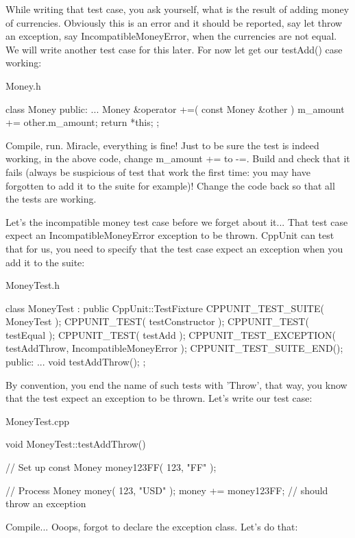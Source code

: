 While writing that test case, you ask yourself, what is the result of adding money of currencies. Obviously this is an error and it should be reported, say let throw an exception, say {\ttfamily IncompatibleMoneyError}, when the currencies are not equal. We will write another test case for this later. For now let get our testAdd() case working:

{\ttfamily Money.h} 
\begin{DoxyCode}
class Money
{
public:
...
  Money &operator +=( const Money &other )
  {
    m_amount += other.m_amount;
    return *this;
  }
}; 
\end{DoxyCode}


Compile, run. Miracle, everything is fine! Just to be sure the test is indeed working, in the above code, change {\ttfamily m\_\-amount} {\ttfamily +=} to {\ttfamily -\/=}. Build and check that it fails (always be suspicious of test that work the first time: you may have forgotten to add it to the suite for example)! Change the code back so that all the tests are working.

Let's the incompatible money test case before we forget about it... That test case expect an {\ttfamily IncompatibleMoneyError} exception to be thrown. CppUnit can test that for us, you need to specify that the test case expect an exception when you add it to the suite:

{\ttfamily MoneyTest.h} 
\begin{DoxyCode}
class MoneyTest : public CppUnit::TestFixture
{
  CPPUNIT_TEST_SUITE( MoneyTest );
  CPPUNIT_TEST( testConstructor );
  CPPUNIT_TEST( testEqual );
  CPPUNIT_TEST( testAdd );
  CPPUNIT_TEST_EXCEPTION( testAddThrow, IncompatibleMoneyError );
  CPPUNIT_TEST_SUITE_END();
public:
  ...
  void testAddThrow();
};
\end{DoxyCode}


By convention, you end the name of such tests with {\ttfamily 'Throw'}, that way, you know that the test expect an exception to be thrown. Let's write our test case:

{\ttfamily MoneyTest.cpp} 
\begin{DoxyCode}
void 
MoneyTest::testAddThrow()
{
  // Set up
  const Money money123FF( 123, "FF" );

  // Process
  Money money( 123, "USD" );
  money += money123FF;        // should throw an exception
}
\end{DoxyCode}


Compile... Ooops, forgot to declare the exception class. Let's do that:

